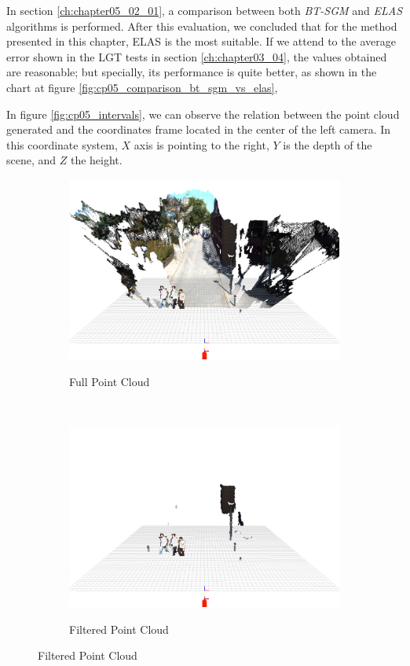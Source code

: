 In section \ref{ch:chapter05_02_01}, a comparison between both \emph{BT-SGM} and \emph{ELAS} algorithms is performed. After this evaluation, we concluded that for the method presented in this chapter, ELAS is the most suitable. If we attend to the average error shown in the \ac{LGT} tests in section \ref{ch:chapter03_04}, the values obtained are reasonable; but specially, its performance is quite better, as shown in the chart at figure \ref{fig:cp05_comparison_bt_sgm_vs_elas}, 

In figure \ref{fig:cp05_intervals}, we can observe the relation between the point cloud generated and the coordinates frame located in the center of the left camera. In this coordinate system, $X$ axis is pointing to the right, $Y$ is the depth of the scene, and $Z$ the height.

\begin{figure}[t]
        \centering
        \begin{subfigure}[b]{0.45\textwidth}
                \centering
                \caption{Full Point Cloud}
                \includegraphics[width=\textwidth,trim=0 50 0 0,clip]{fullPointCloud}\label{fig:cp05_full_pointcloud}
        \end{subfigure}%
        ~ 
        \begin{subfigure}[b]{0.45\textwidth}
                \centering
                \caption{Filtered Point Cloud}
                \includegraphics[width=\textwidth,trim=0 50 0 0,clip]{filteredPointCloud}\label{fig:cp05_filtered_pointcloud}                

\end{subfigure}
\end{figure}

